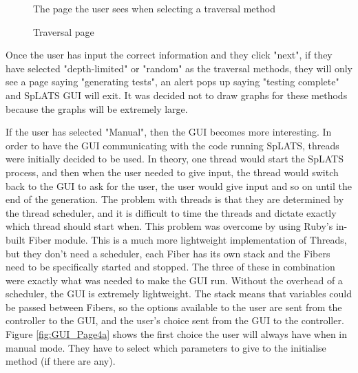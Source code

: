  \begin{figure}
    \centering
    \caption{The page the user sees when selecting a traversal method}
    \label{fig:GUI_SelectTraversal1}
  \end{figure}
  
  \begin{figure}
    \centering
    \caption{Traversal page}
    \label{fig:GUI_SelectTraversal2}
  \end{figure}
  
  Once the user has input the correct information and they click "next", if they have selected "depth-limited" or "random" as the traversal methods, they will only see a page saying "generating tests", an alert pops up saying "testing complete" and SpLATS GUI will exit. It was decided not to draw graphs for these methods because the graphs will be extremely large.
  
  If the user has selected "Manual", then the GUI becomes more interesting. In order to have the GUI communicating with the code running SpLATS, threads were initially decided to be used. In theory, one thread would start the SpLATS process, and then when the user needed to give input, the thread would switch back to the GUI to ask for the user, the user would give input and so on until the end of the generation. The problem with threads is that they are determined by the thread scheduler, and it is difficult to time the threads and dictate exactly which thread should start when. This problem was overcome by using Ruby's in-built Fiber module. This is a much more lightweight implementation of Threads, but they don't need a scheduler, each Fiber has its own stack and the Fibers need to be specifically started and stopped. The three of these in combination were exactly what was needed to make the GUI run. Without the overhead of a scheduler, the GUI is extremely lightweight. The stack means that variables could be passed between Fibers, so the options available to the user are sent from the controller to the GUI, and the user's choice sent from the GUI to the controller. Figure \ref{fig:GUI_Page4a} shows the first choice the user will always have when in manual mode. They have to select which parameters to give to the initialise method (if there are any).
  
